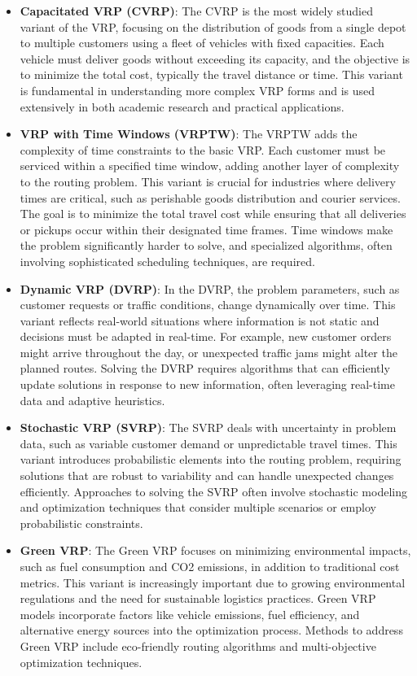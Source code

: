 \documentclass[
]{article}
\begin{document}
\begin{itemize}
  \item \textbf{Capacitated VRP (CVRP)}:
        The CVRP is the most widely studied variant of the VRP, focusing on the distribution of goods from a single depot to multiple customers using a fleet of vehicles with fixed capacities. Each vehicle must deliver goods without exceeding its capacity, and the objective is to minimize the total cost, typically the travel distance or time. This variant is fundamental in understanding more complex VRP forms and is used extensively in both academic research and practical applications.

  \item \textbf{VRP with Time Windows (VRPTW)}:
        The VRPTW adds the complexity of time constraints to the basic VRP. Each customer must be serviced within a specified time window, adding another layer of complexity to the routing problem. This variant is crucial for industries where delivery times are critical, such as perishable goods distribution and courier services. The goal is to minimize the total travel cost while ensuring that all deliveries or pickups occur within their designated time frames. Time windows make the problem significantly harder to solve, and specialized algorithms, often involving sophisticated scheduling techniques, are required.

  \item \textbf{Dynamic VRP (DVRP)}:
        In the DVRP, the problem parameters, such as customer requests or traffic conditions, change dynamically over time. This variant reflects real-world situations where information is not static and decisions must be adapted in real-time. For example, new customer orders might arrive throughout the day, or unexpected traffic jams might alter the planned routes. Solving the DVRP requires algorithms that can efficiently update solutions in response to new information, often leveraging real-time data and adaptive heuristics.

  \item \textbf{Stochastic VRP (SVRP)}:
        The SVRP deals with uncertainty in problem data, such as variable customer demand or unpredictable travel times. This variant introduces probabilistic elements into the routing problem, requiring solutions that are robust to variability and can handle unexpected changes efficiently. Approaches to solving the SVRP often involve stochastic modeling and optimization techniques that consider multiple scenarios or employ probabilistic constraints.

  \item \textbf{Green VRP}:
        The Green VRP focuses on minimizing environmental impacts, such as fuel consumption and CO2 emissions, in addition to traditional cost metrics. This variant is increasingly important due to growing environmental regulations and the need for sustainable logistics practices. Green VRP models incorporate factors like vehicle emissions, fuel efficiency, and alternative energy sources into the optimization process. Methods to address Green VRP include eco-friendly routing algorithms and multi-objective optimization techniques.

\end{itemize}
\end{document}
